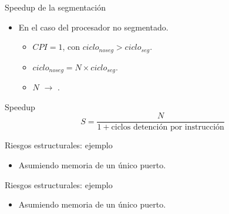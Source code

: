 \begin{frame}[t]{Speedup de la segmentación}
\begin{itemize}
  \item En el caso del procesador no segmentado.
    \begin{itemize}
      \item $CPI=1$, con $ciclo_{noseg} > ciclo_{seg}$.
      \item $ciclo_{noseg} = N \times ciclo_{seg}$.
      \item $N$ $\rightarrow$ .
    \end{itemize}
\end{itemize}
\begin{block}{Speedup}
\[
S =
\frac{N}{1 + \text{ciclos detención por instrucción}}
\]
\end{block}
\end{frame}

\begin{frame}[t]{Riesgos estructurales: ejemplo}
\makebox[\textwidth][c]{

}
\begin{itemize}
  \item Asumiendo memoria de un único puerto.
\end{itemize}
\end{frame}

\begin{frame}[t]{Riesgos estructurales: ejemplo}
\makebox[\textwidth][c]{

}
\begin{itemize}
  \item Asumiendo memoria de un único puerto.
\end{itemize}
\end{frame}

